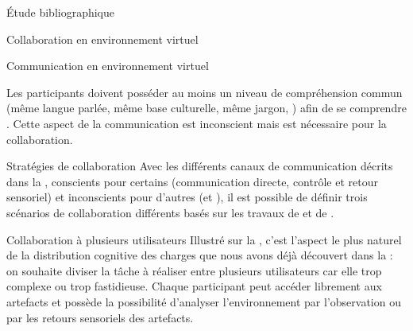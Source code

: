 \documentclass[myfrancais,ngerman,english,frenchb]{mythesis}
\begin{document}
\begin{mychapter}{Étude bibliographique}
\begin{mysection}{Collaboration en environnement virtuel}
\begin{mysubsection}{Communication en environnement virtuel}
				\begin{mysubsubsection}{\myGrounding}
					Les participants doivent posséder au moins un niveau de compréhension commun (même langue parlée, même base culturelle, même jargon, \myetc) afin de se comprendre .
					Cette aspect de la communication est inconscient mais est nécessaire pour la collaboration.
				\end{mysubsubsection}
			\end{mysubsection}
			\begin{mysubsection}{Stratégies de collaboration}
				Avec les différents canaux de communication décrits dans la , conscients pour certains (communication directe, contrôle et retour sensoriel) et inconscients pour d'autres (\myfeedthrough et \mygrounding), il est possible de définir trois scénarios de collaboration différents basés sur les travaux de  et de .
				\begin{mysubsubsection}{Collaboration à plusieurs utilisateurs}
					Illustré sur la , c'est l'aspect le plus naturel de la distribution cognitive des charges que nous avons déjà découvert dans la  : on souhaite diviser la tâche à réaliser entre plusieurs utilisateurs car elle trop complexe ou trop fastidieuse.
					Chaque participant peut accéder librement aux artefacts et possède la possibilité d'analyser l'environnement par l'observation ou par les retours sensoriels des artefacts.


\end{mysubsubsection}
\end{mysubsection}
\end{mysection}
\end{mychapter}
\end{document}
